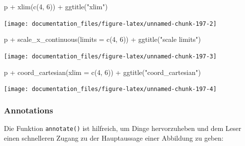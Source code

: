 \documentclass[
]{article}
\newenvironment{Shaded}{\begin{snugshade}}{\end{snugshade}}
\newcommand{\AttributeTok}[1]{\textcolor[rgb]{0.77,0.63,0.00}{#1}}
\newcommand{\DecValTok}[1]{\textcolor[rgb]{0.00,0.00,0.81}{#1}}
\newcommand{\FunctionTok}[1]{\textcolor[rgb]{0.00,0.00,0.00}{#1}}
\newcommand{\NormalTok}[1]{#1}
\newcommand{\SpecialCharTok}[1]{\textcolor[rgb]{0.00,0.00,0.00}{#1}}
\newcommand{\StringTok}[1]{\textcolor[rgb]{0.31,0.60,0.02}{#1}}
\begin{document}
\begin{Shaded}
\begin{Highlighting}[]
\NormalTok{p }\SpecialCharTok{+} \FunctionTok{xlim}\NormalTok{(}\FunctionTok{c}\NormalTok{(}\DecValTok{4}\NormalTok{, }\DecValTok{6}\NormalTok{)) }\SpecialCharTok{+} \FunctionTok{ggtitle}\NormalTok{(}\StringTok{"xlim"}\NormalTok{)}
\end{Highlighting}
\end{Shaded}

\begin{center}\texttt{[image: documentation\_files/figure-latex/unnamed-chunk-197-2]} \end{center}

\begin{Shaded}
\begin{Highlighting}[]
\NormalTok{p }\SpecialCharTok{+} \FunctionTok{scale\_x\_continuous}\NormalTok{(}\AttributeTok{limits =} \FunctionTok{c}\NormalTok{(}\DecValTok{4}\NormalTok{, }\DecValTok{6}\NormalTok{)) }\SpecialCharTok{+} \FunctionTok{ggtitle}\NormalTok{(}\StringTok{"scale limits"}\NormalTok{)}
\end{Highlighting}
\end{Shaded}

\begin{center}\texttt{[image: documentation\_files/figure-latex/unnamed-chunk-197-3]} \end{center}

\begin{Shaded}
\begin{Highlighting}[]
\NormalTok{p }\SpecialCharTok{+} \FunctionTok{coord\_cartesian}\NormalTok{(}\AttributeTok{xlim =} \FunctionTok{c}\NormalTok{(}\DecValTok{4}\NormalTok{, }\DecValTok{6}\NormalTok{)) }\SpecialCharTok{+} \FunctionTok{ggtitle}\NormalTok{(}\StringTok{"coord\_cartesian"}\NormalTok{)}
\end{Highlighting}
\end{Shaded}

\begin{center}\texttt{[image: documentation\_files/figure-latex/unnamed-chunk-197-4]} \end{center}

\hypertarget{annotations}{%
\subsubsection{Annotations}\label{annotations}}

Die Funktion \texttt{annotate()} ist hilfreich, um Dinge hervorzuheben und dem Leser einen schnelleren Zugang zu der Hauptaussage einer Abbildung zu geben:
\end{document}
